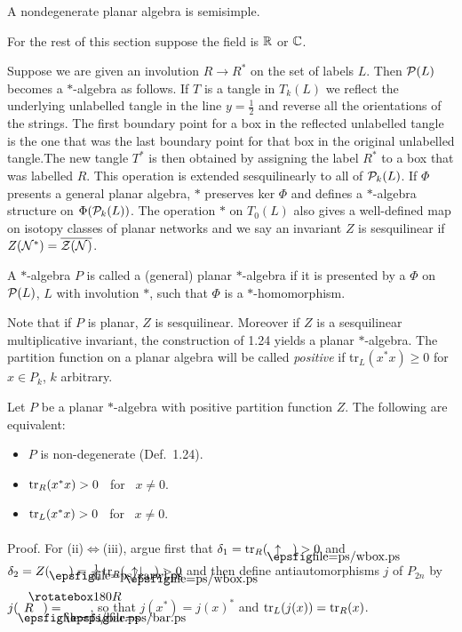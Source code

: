\bs
{} A
nondegenerate planar algebra is semisimple.


\bs{}

 For the rest of this section suppose the field is $\Bbb R$ or
$\Bbb C$.

Suppose we are given an involution $R\to R^*$ on the set of labels
$L$. Then $\P(L)$ becomes a $*$-algebra as follows. If $T$ is a
tangle in $T_k(L)$ we reflect the underlying unlabelled tangle in
the line $y=\frac 12$ and reverse all the orientations of the
strings. The first boundary point for a box in the reflected 
unlabelled tangle is the one that was the last boundary point for that box
in the original unlabelled tangle.The new tangle $T^*$ is then obtained  by assigning the
label $R^*$ to a box that was labelled $R$. This operation is
extended sesquilinearly to all of $\P_k(L)$. If $\Phi$ presents a
general planar algebra, $*$ preserves ker $\Phi$ and defines a
$*$-algebra structure on $\Phi(\P_k(L))$. The operation $*$ on
$T_0(L)$ also gives a well-defined map on isotopy classes of planar
networks and we say an invariant $Z$ is sesquilinear if
$Z(\cal N^*)=\overline{Z(\cal N)}$.

 A $*$-algebra $P$ is called a (general)
planar $*$-algebra if it is presented by a $\Phi$ on  $\P(L)$, $L$
with involution $*$, such that $\Phi$ is a $*$-homomorphism.

Note that if $P$ is planar, $Z$ is sesquilinear. Moreover if $Z$
is a sesquilinear multiplicative invariant, the construction of
1.24 yields a planar $*$-algebra.
The partition function on a planar algebra will be called {\it
positive} if tr${}_L(x^*x) \geq 0$ for $x\in P_k$, $k$ arbitrary.

\bs
{} Let $P$ be a  planar
$*$-algebra with positive partition function $Z$. The following
are equivalent:
\begin{itemize}
\item[(i)] $P$ is non-degenerate {\rm{(Def.~1.24).}}

\item[(ii)] ${\op{tr}}_R(x^*x) > 0$ \ for \ $x\neq 0$.

\item[(iii)] ${\op{tr}}_L(x^*x) > 0$ \ for \ $x\neq 0$.
\end{itemize}

{\sc Proof}. For (ii)$\Leftrightarrow$(iii), argue first that
$\d_1={\op{tr}}_R(  \blankbox{\uparrow}) > 0$ and
$\d_2=Z(\caleft\ )=\frac{1}{\d_1}
{\op{tr}}_R( \blankbox{\ \uparrow\downarrow} \ ) > 0$
and then define antiautomorphisms $j$ of $P_{2n}$ by
$j(\boxas{R})=\boxasR$, so that
$j(x^*)=j(x)^*$ and ${\op{tr}}_L(j(x))={\op{tr}}_R(x)$.


